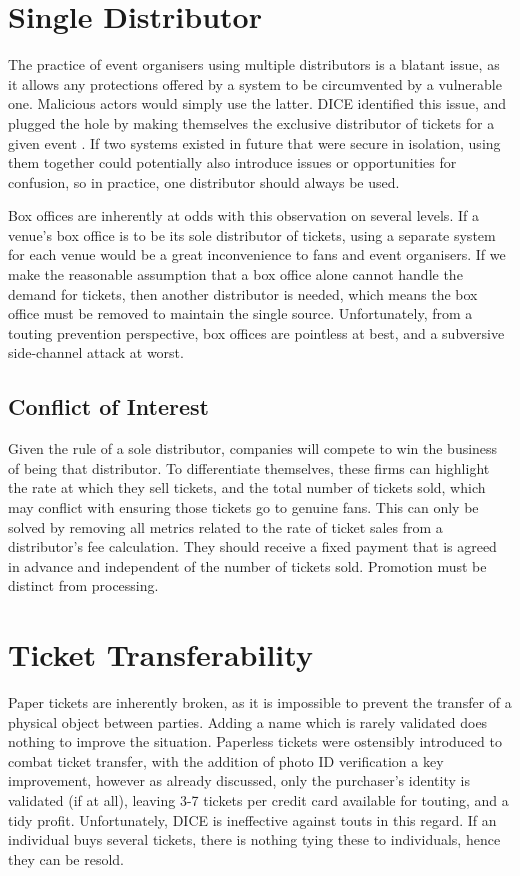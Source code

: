 \documentclass[12pt,a4paper]{bhamdissertation}
\begin{document}
\section{Single Distributor}

The practice of event organisers using multiple distributors is a blatant issue, as it allows any protections offered by a system to be circumvented by a vulnerable one. Malicious actors would simply use the latter. DICE identified this issue, and plugged the hole by making themselves the exclusive distributor of tickets for a given event \cite{D16}. If two systems existed in future that were secure in isolation, using them together could potentially also introduce issues or opportunities for confusion, so in practice, one distributor should always be used.

Box offices are inherently at odds with this observation on several levels. If a venue's box office is to be its sole distributor of tickets, using a separate system for each venue would be a great inconvenience to fans and event organisers. If we make the reasonable assumption that a box office alone cannot handle the demand for tickets, then another distributor is needed, which means the box office must be removed to maintain the single source. Unfortunately, from a touting prevention perspective, box offices are pointless at best, and a subversive side-channel attack at worst.

\subsection{Conflict of Interest}

Given the rule of a sole distributor, companies will compete to win the business of being that distributor. To differentiate themselves, these firms can highlight the rate at which they sell tickets, and the total number of tickets sold, which may conflict with ensuring those tickets go to genuine fans. This can only be solved by removing all metrics related to the rate of ticket sales from a distributor's fee calculation. They should receive a fixed payment that is agreed in advance and independent of the number of tickets sold. Promotion must be distinct from processing.

\section{Ticket Transferability}

Paper tickets are inherently broken, as it is impossible to prevent the transfer of a physical object between parties. Adding a name which is rarely validated does nothing to improve the situation. Paperless tickets were ostensibly introduced to combat ticket transfer, with the addition of photo ID \cite{B07} verification a key improvement, however as already discussed, only the purchaser's identity is validated (if at all), leaving 3-7 tickets per credit card available for touting, and a tidy profit. Unfortunately, DICE is ineffective against touts in this regard. If an individual buys several tickets, there is nothing tying these to individuals, hence they can be resold.
\end{document}
